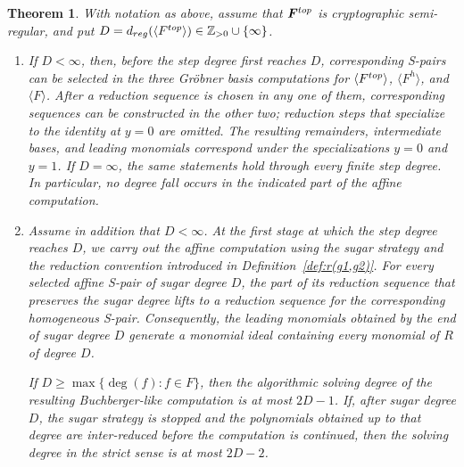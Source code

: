 \documentclass{article}
\theoremstyle{definition}
\theoremstyle{plain}
\newtheorem{theor}{Theorem}
\theoremstyle{plain}
\theoremstyle{plain}
\theoremstyle{plain}
\numberwithin{equation}{subsection}
\begin{document}
\begin{theor}\label{thm:mainC}
With notation as above, assume that $\bm F^{\rm top}$ is cryptographic semi-regular, and put $D=d_{\rm reg}(\langle F^{\rm top}\rangle)\in \mathbb{Z}_{>0}\cup \{\infty\}$.
\begin{enumerate}
\item[(1)]
If $D<\infty$, then, before the step degree first reaches $D$, corresponding S-pairs can be selected in the three Gr\"obner basis computations for $\langle F^{\rm top}\rangle$, $\langle F^h\rangle$, and $\langle F\rangle$.
After a reduction sequence is chosen in any one of them, corresponding sequences can be constructed in the other two;
reduction steps that specialize to the identity at $y=0$ are omitted.
The resulting remainders, intermediate bases, and leading monomials correspond under the specializations $y=0$ and $y=1$.
If $D=\infty$, the same statements hold through every finite step degree.
In particular, no degree fall occurs in the indicated part of the affine computation.

\item[(2)]
Assume in addition that $D<\infty$.
At the first stage at which the step degree reaches $D$, we carry out the affine computation using the sugar strategy and the reduction convention introduced in Definition~\ref{def:r(g1,g2)}.
For every selected affine S-pair of sugar degree $D$, the part of its reduction sequence that preserves the sugar degree lifts to a reduction sequence for the corresponding homogeneous S-pair.
Consequently, the leading monomials obtained by the end of sugar degree $D$ generate a monomial ideal containing every monomial of $R$ of degree $D$.

If $D\geq\max\{\deg(f):f\in F\}$, then the algorithmic solving degree
of the resulting Buchberger-like computation is at most $2D-1$.
If, after sugar degree $D$, the sugar strategy is stopped and the
polynomials obtained up to that degree are inter-reduced before the
computation is continued, then the solving degree in the strict sense
is at most $2D-2$.
\end{enumerate}
\end{theor}
\end{document}
